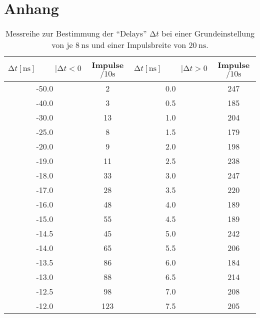 \section{Anhang}

\begin{table}
    \centering
    \caption{Messreihe zur Bestimmung der \enquote{Delays} $\increment t$ bei einer Grundeinstellung von je $\SI{8}{\nano\second}$ und einer Impulsbreite von $\SI{20}{\nano\second}$. } 
    \label{tab:MessreiheDelay20ns}
    \begin{tabular}{c c || c c}
        \toprule
        $\increment t [\si{\nano\second}] \hspace{1cm}|\increment t < 0 $ & Impulse $\si{\per{10}\second} $ & $\increment t [\si{\nano\second}] \hspace{1cm}|\increment t > 0 $ & Impulse $\si{\per{10}\second}$ \\
        \midrule
            -50.0    &      2     &   0.0       &     247   \\               
            -40.0    &      3     &   0.5     &     185   \\ 
            -30.0    &      13    &   1.0       &     204   \\     
            -25.0    &      8     &   1.5     &     179   \\ 
            -20.0    &      9     &   2.0       &     198   \\     
            -19.0    &      11    &   2.5     &     238   \\  
            -18.0    &      33    &   3.0       &     247   \\     
            -17.0    &      28    &   3.5     &     220   \\  
            -16.0    &      48    &   4.0       &     189   \\     
            -15.0    &      55    &   4.5     &     189   \\     
            -14.5  &      45    &   5.0       &     242   \\     
            -14.0    &      65    &   5.5     &     206   \\  
            -13.5  &      86    &   6.0       &     184   \\     
            -13.0    &      88    &   6.5     &     214   \\  
            -12.5  &      98    &   7.0       &     208   \\     
            -12.0    &      123   &   7.5     &     205   \\   

\end{tabular}
\end{table}
